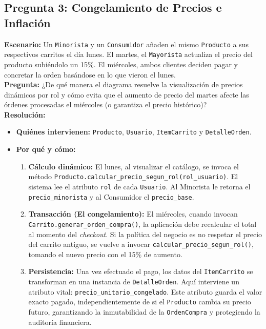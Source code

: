 \documentclass[12pt,a4paper]{report}
\begin{document}
\subsection*{Pregunta 3: Congelamiento de Precios e Inflación}
\textbf{Escenario:} Un \texttt{Minorista} y un \texttt{Consumidor} añaden el mismo \texttt{Producto} a sus respectivos carritos el día lunes. El martes, el \texttt{Mayorista} actualiza el precio del producto subiéndolo un 15\%. El miércoles, ambos clientes deciden pagar y concretar la orden basándose en lo que vieron el lunes.\\
\textbf{Pregunta:} ¿De qué manera el diagrama resuelve la visualización de precios dinámicos por rol y cómo evita que el aumento de precio del martes afecte las órdenes procesadas el miércoles (o garantiza el precio histórico)?\\
\textbf{Resolución:}
\begin{itemize}
    \item \textbf{Quiénes intervienen:} \texttt{Producto}, \texttt{Usuario}, \texttt{ItemCarrito} y \texttt{DetalleOrden}.
    \item \textbf{Por qué y cómo:}
    \begin{enumerate}
        \item \textbf{Cálculo dinámico:} El lunes, al visualizar el catálogo, se invoca el método \texttt{Producto.calcular\_precio\_segun\_rol(rol\_usuario)}. El sistema lee el atributo \texttt{rol} de cada \texttt{Usuario}. Al Minorista le retorna el \texttt{precio\_minorista} y al Consumidor el \texttt{precio\_base}.
        \item \textbf{Transacción (El congelamiento):} El miércoles, cuando invocan \texttt{Carrito.generar\_orden\_compra()}, la aplicación debe recalcular el total al momento del \textit{checkout}. Si la política del negocio es no respetar el precio del carrito antiguo, se vuelve a invocar \texttt{calcular\_precio\_segun\_rol()}, tomando el nuevo precio con el 15\% de aumento.
        \item \textbf{Persistencia:} Una vez efectuado el pago, los datos del \texttt{ItemCarrito} se transforman en una instancia de \texttt{DetalleOrden}. Aquí interviene un atributo vital: \texttt{precio\_unitario\_congelado}. Este atributo guarda el valor exacto pagado, independientemente de si el \texttt{Producto} cambia su precio futuro, garantizando la inmutabilidad de la \texttt{OrdenCompra} y protegiendo la auditoría financiera.
    \end{enumerate}
\end{itemize}
\end{document}
